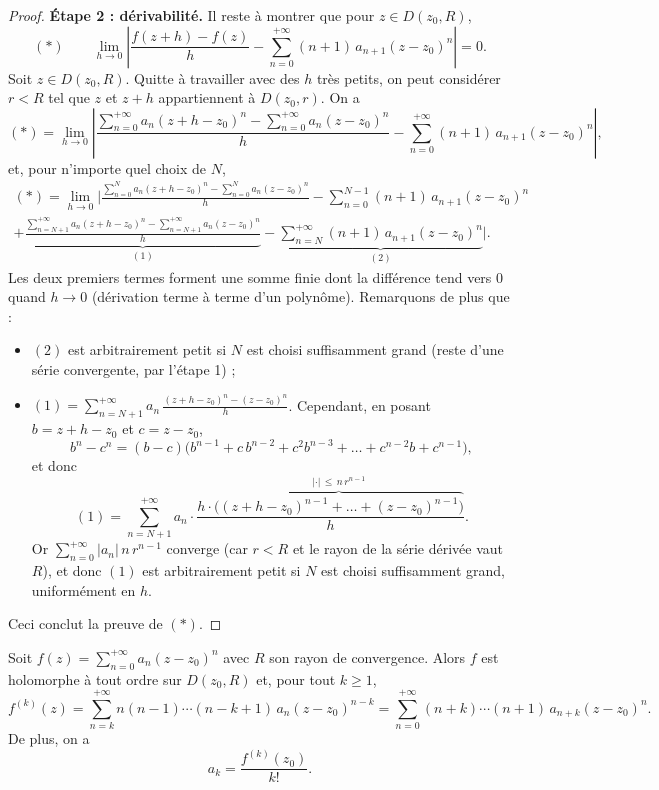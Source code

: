 \begin{proof}
\textbf{Étape 2 : dérivabilité.}
Il reste à montrer que pour $z \in D(z_0,R)$,
\[
(\ast)\qquad \lim_{h \to 0} \left| \frac{f(z+h) - f(z)}{h} - \sum_{n=0}^{+\infty} (n+1)\, a_{n+1} (z-z_0)^n \right| = 0 .
\]
Soit $z \in D(z_0,R)$. Quitte à travailler avec des $h$ très petits, on peut considérer $r < R$ tel que
$z$ et $z+h$ appartiennent à $D(z_0,r)$. On a
\[
(\ast) = \lim_{h \to 0} \left|
\frac{\displaystyle\sum_{n=0}^{+\infty} a_n (z+h-z_0)^n - \sum_{n=0}^{+\infty} a_n (z-z_0)^n}{h}
- \sum_{n=0}^{+\infty} (n+1)\, a_{n+1} (z-z_0)^n \right| ,
\]
et, pour n'importe quel choix de $N$,
\begin{multline*}
(\ast) = \lim_{h \to 0} \Bigg|
\frac{\displaystyle\sum_{n=0}^{N} a_n (z+h-z_0)^n - \sum_{n=0}^{N} a_n (z-z_0)^n}{h}
- \sum_{n=0}^{N-1} (n+1)\, a_{n+1} (z-z_0)^n \\
+ \underbrace{\frac{\displaystyle\sum_{n=N+1}^{+\infty} a_n (z+h-z_0)^n - \sum_{n=N+1}^{+\infty} a_n (z-z_0)^n}{h}}_{(1)}
- \underbrace{\sum_{n=N}^{+\infty} (n+1)\, a_{n+1} (z-z_0)^n}_{(2)}
\Bigg| .
\end{multline*}
Les deux premiers termes forment une somme finie dont la différence tend vers $0$ quand $h \to 0$
(dérivation terme à terme d'un polynôme). Remarquons de plus que :
\begin{itemize}
  \item $(2)$ est arbitrairement petit si $N$ est choisi suffisamment grand (reste d'une série convergente, par l'étape 1) ;
  \item $(1) = \displaystyle\sum_{n=N+1}^{+\infty} a_n \, \frac{(z+h-z_0)^n - (z-z_0)^n}{h}$.
  Cependant, en posant $b = z+h-z_0$ et $c = z-z_0$,
  \[
  b^n - c^n = (b-c)\big( b^{n-1} + c\,b^{n-2} + c^2 b^{n-3} + \dots + c^{n-2} b + c^{n-1} \big),
  \]
  et donc
  \[
  (1) = \sum_{n=N+1}^{+\infty} a_n \cdot \frac{h \cdot \overbrace{\big( (z+h-z_0)^{n-1} + \dots + (z-z_0)^{n-1} \big)}^{|\cdot| \,\leq\, n\, r^{n-1}}}{h} .
  \]
  Or $\displaystyle\sum_{n=0}^{+\infty} |a_n|\, n\, r^{n-1}$ converge (car $r < R$ et le rayon de la série dérivée vaut $R$),
  et donc $(1)$ est arbitrairement petit si $N$ est choisi suffisamment grand, uniformément en $h$.
\end{itemize}
Ceci conclut la preuve de $(\ast)$.
\end{proof}

\begin{corollaire}
Soit $f(z) = \displaystyle\sum_{n=0}^{+\infty} a_n (z-z_0)^n$ avec $R$ son rayon de convergence.
Alors $f$ est holomorphe à tout ordre sur $D(z_0,R)$ et, pour tout $k \geq 1$,
\[
f^{(k)}(z) = \sum_{n=k}^{+\infty} n(n-1)\cdots(n-k+1)\, a_n (z-z_0)^{n-k}
= \sum_{n=0}^{+\infty} (n+k)\cdots(n+1)\, a_{n+k} (z-z_0)^n .
\]
De plus, on a
\[
a_k = \frac{f^{(k)}(z_0)}{k!} .
\]
\end{corollaire}

